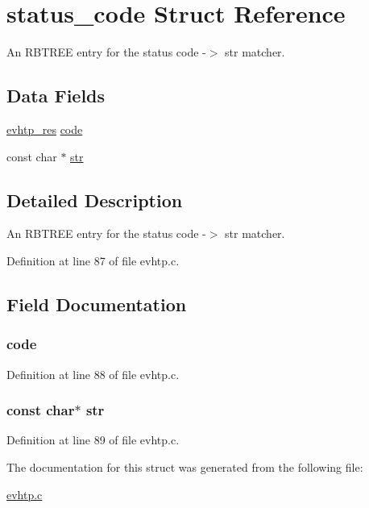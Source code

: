\hypertarget{structstatus__code}{
\section{status\_\-code Struct Reference}
\label{structstatus__code}
}


An RBTREE entry for the status code -\/$>$ str matcher.  


\subsection*{Data Fields}
\begin{DoxyCompactItemize}
\item 
\hyperlink{evhtp_8h_ac6ada2a29bcb7a7ddcfdcabc0d37022a}{evhtp\_\-res} \hyperlink{structstatus__code_a82a42ee8db265277fbc5bec58a7ef11d}{code}
\item 
const char $\ast$ \hyperlink{structstatus__code_af25d6dc49269fa2003ac7c7fa6f13915}{str}
\end{DoxyCompactItemize}


\subsection{Detailed Description}
An RBTREE entry for the status code -\/$>$ str matcher. 

Definition at line 87 of file evhtp.c.



\subsection{Field Documentation}
\hypertarget{structstatus__code_a82a42ee8db265277fbc5bec58a7ef11d}{
\subsubsection[{code}]{ {\bf code}}}
\label{structstatus__code_a82a42ee8db265277fbc5bec58a7ef11d}


Definition at line 88 of file evhtp.c.

\hypertarget{structstatus__code_af25d6dc49269fa2003ac7c7fa6f13915}{
\subsubsection[{str}]{\setlength{\rightskip}{0pt plus 5cm}const char$\ast$ {\bf str}}}
\label{structstatus__code_af25d6dc49269fa2003ac7c7fa6f13915}


Definition at line 89 of file evhtp.c.



The documentation for this struct was generated from the following file:\begin{DoxyCompactItemize}
\item 
\hyperlink{evhtp_8c}{evhtp.c}\end{DoxyCompactItemize}
